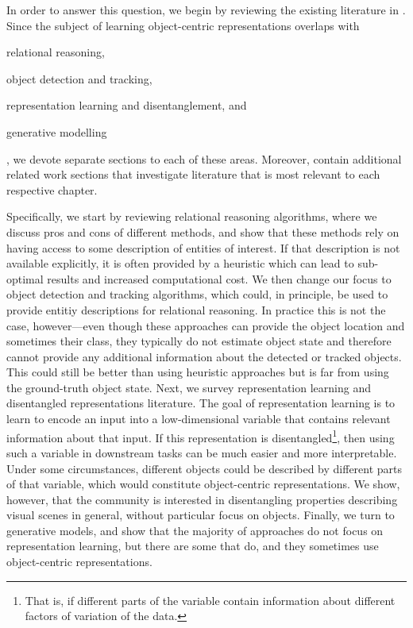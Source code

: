  	In order to answer this question, we begin by reviewing the existing literature in . 
 	Since the subject of learning object-centric representations overlaps with
 	\begin{inparaenum}[(1)\!]
 		\item relational reasoning,
 		\item object detection and tracking,
 		\item representation learning and disentanglement, and
 		\item generative modelling
	\end{inparaenum}, we devote separate sections to each of these areas. 
	Moreover,  contain additional related work sections that investigate literature that is most relevant to each respective chapter.
 	
 	Specifically, we start by reviewing relational reasoning algorithms, where we discuss pros and cons of different methods, and show that these methods rely on having access to some description of entities of interest.
 	If that description is not available explicitly, it is often provided by a heuristic which can lead to sub-optimal results and increased computational cost.
 	We then change our focus to object detection and tracking algorithms, which could, in principle, be used to provide entitiy descriptions for relational reasoning. In practice this is not the case, however---even though these approaches can provide the object location and sometimes their class, they typically do not estimate object state and therefore cannot provide any additional information about the detected or tracked objects.
 	This could still be better than using heuristic approaches but is far from using the ground-truth object state.
 	Next, we survey representation learning and disentangled representations literature.
 	The goal of representation learning is to learn to encode an input into a low-dimensional variable that contains relevant information about that input.
 	If this representation is disentangled\footnote{That is, if different parts of the variable contain information about different factors of variation of the data.}, then using such a variable in downstream tasks can be much easier and more interpretable.
 	Under some circumstances, different objects could be described by different parts of that variable, which would constitute object-centric representations.
 	We show, however, that the community is interested in disentangling properties describing visual scenes in general, without particular focus on objects.
 	Finally, we turn to generative models, and show that the majority of approaches do not focus on representation learning, but there are some that do, and they sometimes use object-centric representations.
 	 
